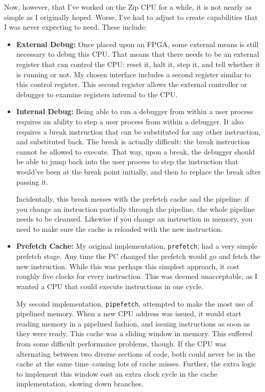 \documentclass{gqtekspec}
\begin{document}
Now, however, that I've worked on the Zip CPU for a while, it is not nearly
as simple as I originally hoped.  Worse, I've had to adjust to create
capabilities that I was never expecting to need.  These include:
\begin{itemize}
\item {\bf External Debug:} Once placed upon an FPGA, some external means is
	still necessary to debug this CPU.  That means that there needs to be
	an external register that can control the CPU: reset it, halt it, step
	it, and tell whether it is running or not.  My chosen interface
	includes a second register similar to this control register.  This
	second register allows the external controller or debugger to examine
	registers internal to the CPU.

\item {\bf Internal Debug:} Being able to run a debugger from within
	a user process requires an ability to step a user process from
	within a debugger.  It also requires a break instruction that can
	be substituted for any other instruction, and substituted back.
	The break is actually difficult: the break instruction cannot be
	allowed to execute.  That way, upon a break, the debugger should
	be able to jump back into the user process to step the instruction
	that would've been at the break point initially, and then to 
	replace the break after passing it.

	Incidentally, this break messes with the prefetch cache and the
	pipeline: if you change an instruction partially through the pipeline,
	the whole pipeline needs to be cleansed.  Likewise if you change
	an instruction in memory, you need to make sure the cache is reloaded
	with the new instruction.

\item {\bf Prefetch Cache:} My original implementation, {\tt prefetch}, had
	a very simple prefetch stage.  Any time the PC changed the prefetch
	would go and fetch the new instruction.  While this was perhaps this
	simplest approach, it cost roughly five clocks for every instruction. 
	This was deemed unacceptable, as I wanted a CPU that could execute
	instructions in one cycle. 

	My second implementation, {\tt pipefetch}, attempted to make the most
	use of pipelined memory.  When a new CPU address was issued, it would
	start reading
	memory in a pipelined fashion, and issuing instructions as soon as they
	were ready.  This cache was a sliding window in memory.  This suffered
	from some difficult performance problems, though.  If the CPU was
	alternating between two diverse sections of code, both could never be
	in the cache at the same time--causing lots of cache misses.  Further,
	the extra logic to implement this window cost an extra clock cycle
	in the cache implementation, slowing down branches.


\end{itemize}
\end{document}

